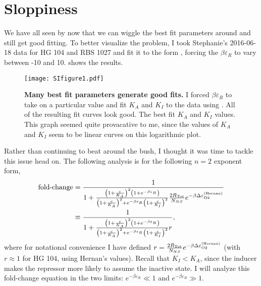 \section{Sloppiness} \label{AppendixSloppiness}


We have all seen by now that we can wiggle the best fit parameters around and still get good fitting. To better visualize the problem, I took Stephanie's 2016-06-18 data for HG 104 and RBS 1027 and fit it to the form \eref[AppendixSloppinessEq1], forcing the $\beta \varepsilon_R$ to vary between -10 and 10. \fref[SIfig1] shows the results.
\begin{figure}[h]
	\centering \texttt{[image: SIfigure1.pdf]}
	\caption{{\bf Many best fit parameters generate good fits.}  I forced $\beta \varepsilon_R$ to take on a particular value and fit $K_A$ and $K_I$ to the data using \eref[AppendixSloppinessEq1]. All of the resulting fit curves look good.  The best fit $K_A$ and $K_I$ values. This graph seemed quite provacative to me, since the values of $K_A$ and $K_I$ seem to be linear curves on this logarithmic plot.}
	\label{SIfig1}
\end{figure}

Rather than continuing to beat around the bush, I thought it was time to tackle this issue head on. The following analysis is for the following $n=2$
exponent form,
\begin{align} \label{AppendixSloppinessEq1}
\operatorname{fold-change} &= \frac{1}{1+\frac{\left( 1 + \frac{c}{K_A} \right)^2 \left(1 + e^{-\beta \varepsilon_R} \right)}{\left( 1 + \frac{c}{K_A} \right)^2 + e^{-\beta \varepsilon_R} \left( 1 + \frac{c}{K_I} \right)^2} \frac{2 R_{\text{Tot}}}{N_{NS}} e^{-\beta \Delta\varepsilon_{\text{O2}}^{(\text{Hernan})}}}\nonumber\\
&\equiv \frac{1}{1+\frac{\left( 1 + \frac{c}{K_A} \right)^2 \left(1 + e^{-\beta \varepsilon_R} \right)}{\left( 1 + \frac{c}{K_A} \right)^2 + e^{-\beta \varepsilon_R} \left( 1 + \frac{c}{K_I} \right)^2} r},
\end{align}
where for notational convenience I have defined $r = \frac{2 R_{\text{Tot}}}{N_{NS}}
e^{-\beta \Delta\varepsilon_{\text{O2}}^{(\text{Hernan})}}$ (with $r \approx 1$ for
HG 104, using Hernan's values). Recall that $K_I < K_A$, since the inducer makes
the repressor more likely to assume the inactive state. I will analyze this
fold-change equation in the two limits: $e^{-\beta \varepsilon_R} \ll 1$ and
$e^{-\beta \varepsilon_R} \gg 1$.

